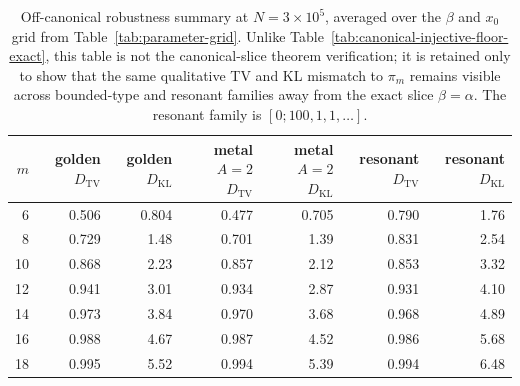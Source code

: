 \begin{table}[H]
\centering
\scriptsize
\setlength{\tabcolsep}{4pt}
\caption{Off-canonical robustness summary at \(N=3\times 10^5\), averaged over
the \(\beta\) and \(x_0\) grid from Table~\ref{tab:parameter-grid}. Unlike
Table~\ref{tab:canonical-injective-floor-exact}, this table is not the
canonical-slice theorem verification; it is retained only to show that the same
qualitative TV and KL mismatch to \(\pi_m\) remains visible across bounded-type
and resonant families away from the exact slice \(\beta=\alpha\). The resonant
family is \([0;100,1,1,\dots]\).}
\label{tab:rotation-parry-gap-summary}
\begin{tabular}{rrrrrrr}
\toprule
\(m\) & golden \(D_{\mathrm{TV}}\) & golden \(D_{\mathrm{KL}}\) & metal \(A=2\) \(D_{\mathrm{TV}}\) & metal \(A=2\) \(D_{\mathrm{KL}}\) & resonant \(D_{\mathrm{TV}}\) & resonant \(D_{\mathrm{KL}}\)\\
\midrule
6  & 0.506 & 0.804 & 0.477 & 0.705 & 0.790 & 1.76\\
8  & 0.729 & 1.48  & 0.701 & 1.39  & 0.831 & 2.54\\
10 & 0.868 & 2.23  & 0.857 & 2.12  & 0.853 & 3.32\\
12 & 0.941 & 3.01  & 0.934 & 2.87  & 0.931 & 4.10\\
14 & 0.973 & 3.84  & 0.970 & 3.68  & 0.968 & 4.89\\
16 & 0.988 & 4.67  & 0.987 & 4.52  & 0.986 & 5.68\\
18 & 0.995 & 5.52  & 0.994 & 5.39  & 0.994 & 6.48\\
\bottomrule
\end{tabular}
\end{table}
